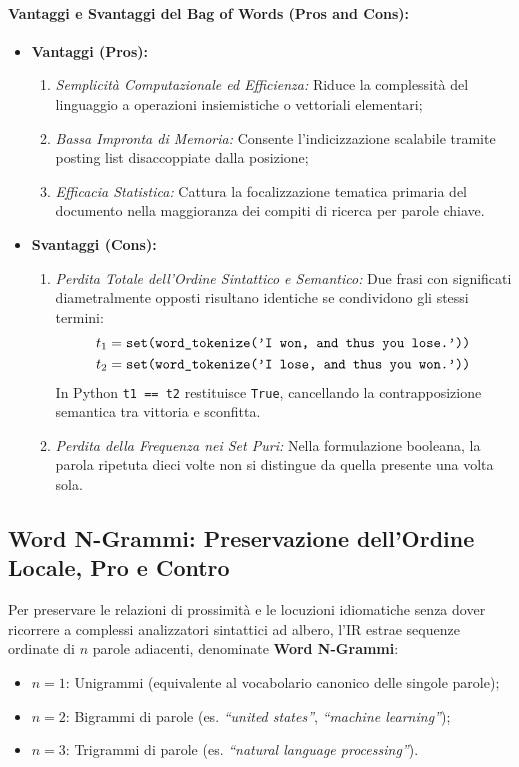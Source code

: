 \paragraph{Vantaggi e Svantaggi del Bag of Words (Pros and Cons):}
\begin{itemize}
    \item \textbf{Vantaggi (Pros):}
    \begin{enumerate}
        \item \textit{Semplicit\`a Computazionale ed Efficienza:} Riduce la complessit\`a del linguaggio a operazioni insiemistiche o vettoriali elementari;
        \item \textit{Bassa Impronta di Memoria:} Consente l'indicizzazione scalabile tramite posting list disaccoppiate dalla posizione;
        \item \textit{Efficacia Statistica:} Cattura la focalizzazione tematica primaria del documento nella maggioranza dei compiti di ricerca per parole chiave.
    \end{enumerate}
    \item \textbf{Svantaggi (Cons):}
    \begin{enumerate}
        \item \textit{Perdita Totale dell'Ordine Sintattico e Semantico:} Due frasi con significati diametralmente opposti risultano identiche se condividono gli stessi termini:
        \begin{align*}
        t_1 &= \text{\texttt{set(word\_tokenize('I won, and thus you lose.'))}} \\
        t_2 &= \text{\texttt{set(word\_tokenize('I lose, and thus you won.'))}}
        \end{align*}
        In Python \texttt{t1 == t2} restituisce \texttt{True}, cancellando la contrapposizione semantica tra vittoria e sconfitta.
        \item \textit{Perdita della Frequenza nei Set Puri:} Nella formulazione booleana, la parola ripetuta dieci volte non si distingue da quella presente una volta sola.
    \end{enumerate}
\end{itemize}

\FloatBarrier
\subsection{Word N-Grammi: Preservazione dell'Ordine Locale, Pro e Contro}
\label{subsec:word-ngrams}

Per preservare le relazioni di prossimit\`a e le locuzioni idiomatiche senza dover ricorrere a complessi analizzatori sintattici ad albero, l'IR estrae sequenze ordinate di $n$ parole adiacenti, denominate \textbf{Word N-Grammi}:
\begin{itemize}
    \item $n = 1$: Unigrammi (equivalente al vocabolario canonico delle singole parole);
    \item $n = 2$: Bigrammi di parole (es. \textit{``united states''}, \textit{``machine learning''});
    \item $n = 3$: Trigrammi di parole (es. \textit{``natural language processing''}).
\end{itemize}

